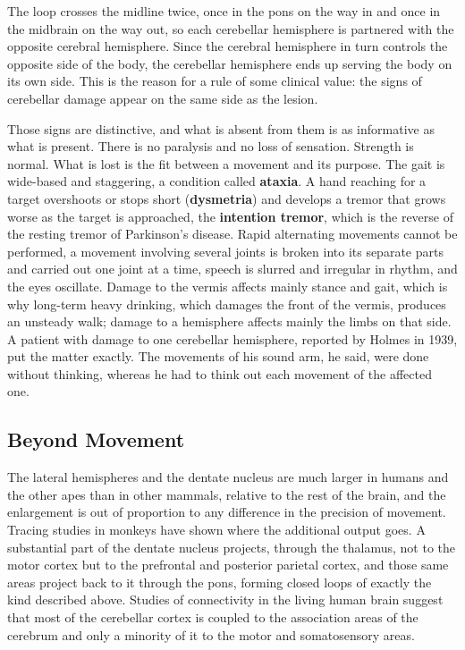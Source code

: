 \documentclass[11pt]{article}
\begin{document}
The loop crosses the midline twice, once in the pons on the way in and once in the midbrain on the way out, so each cerebellar hemisphere is partnered with the opposite cerebral hemisphere. Since the cerebral hemisphere in turn controls the opposite side of the body, the cerebellar hemisphere ends up serving the body on its own side. This is the reason for a rule of some clinical value: the signs of cerebellar damage appear on the same side as the lesion.

Those signs are distinctive, and what is absent from them is as informative as what is present. There is no paralysis and no loss of sensation. Strength is normal. What is lost is the fit between a movement and its purpose. The gait is wide-based and staggering, a condition called \textbf{ataxia}. A hand reaching for a target overshoots or stops short (\textbf{dysmetria}) and develops a tremor that grows worse as the target is approached, the \textbf{intention tremor}, which is the reverse of the resting tremor of Parkinson's disease. Rapid alternating movements cannot be performed, a movement involving several joints is broken into its separate parts and carried out one joint at a time, speech is slurred and irregular in rhythm, and the eyes oscillate. Damage to the vermis affects mainly stance and gait, which is why long-term heavy drinking, which damages the front of the vermis, produces an unsteady walk; damage to a hemisphere affects mainly the limbs on that side. A patient with damage to one cerebellar hemisphere, reported by Holmes in 1939, put the matter exactly. The movements of his sound arm, he said, were done without thinking, whereas he had to think out each movement of the affected one.

\subsection{Beyond Movement}

The lateral hemispheres and the dentate nucleus are much larger in humans and the other apes than in other mammals, relative to the rest of the brain, and the enlargement is out of proportion to any difference in the precision of movement. Tracing studies in monkeys have shown where the additional output goes. A substantial part of the dentate nucleus projects, through the thalamus, not to the motor cortex but to the prefrontal and posterior parietal cortex, and those same areas project back to it through the pons, forming closed loops of exactly the kind described above. Studies of connectivity in the living human brain suggest that most of the cerebellar cortex is coupled to the association areas of the cerebrum and only a minority of it to the motor and somatosensory areas.
\end{document}
